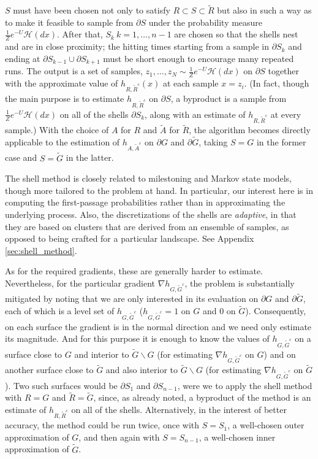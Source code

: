 \documentclass[12pt, nofootinbib,english, amsmath, amssymb, aps, priprint, graphicx,floatfix]{revtex4-1}
\theoremstyle{plain}
\theoremstyle{definition}
\theoremstyle{plain}
\newcommand{\hausdorffmeasure}{\mathscr{H}(dx)}
\begin{document}
$S$ must have been chosen not only to satisfy $R\subset S  \subset\tilde{R}$ but also in such a way as to make it feasible to sample from $\partial S$ under the probability measure
$\frac{1}{Z}e^{-U}\hausdorffmeasure$. After that, $S_k\ k=1,\ldots,n-1$ are chosen so that the shells nest and are in close proximity; the hitting times starting from a sample in $\partial
 S_k$ and ending at $\partial S_{k-1} \cup \partial S_{k+1}$ must be short enough to encourage many repeated runs. The output is a set of samples,
 $z_1,\ldots,z_N \sim \frac{1}{Z}e^{-U}\hausdorffmeasure$ on $\partial S$ together with the approximate value of $h_{R,\tilde{R}^c}(x)$ at each sample $x=z_i$. (In fact, though the main purpose is to estimate $h_{R,\tilde{R}^c}$ on
 $\partial S$, a byproduct is a sample from $\frac{1}{Z}e^{-U}\hausdorffmeasure$ on all of the shells $\partial S_k$, along with an estimate of $h_{R,\tilde{R}^c}$ at every sample.)
With the choice of $A$ for $R$ and $\tilde A$ for $\tilde R$, the algorithm becomes directly applicable to the estimation of $h_{A, \tilde{A}^c}$ on $\partial G$ and $\partial\tilde{G}$, taking $S=G$ in the former case and $S=\tilde{G}$ in the latter.

The shell method is closely related to milestoning\cite{West2007-cn, Bello-Rivas2015-ld, Aristoff2016-gc} and Markov state models\cite{Pande2010-yi, Chodera2014-bh, Husic2018-xp}, though more tailored to the problem at hand. In particular, our interest here is in computing the first-passage probabilities rather than in approximating the underlying process. Also, the discretizations of the shells are {\em adaptive}, in that they are based on clusters that are derived from an ensemble of samples, as opposed to being crafted for a particular landscape.  See Appendix \ref{sec:shell_method}.

As for the required gradients, these are generally harder to estimate. Nevertheless, for the particular gradient $\nabla h_{G, \tilde{G}^c}$, the problem is substantially mitigated by noting that we are only interested in its evaluation on $\partial G$ and $\partial\tilde G$, each of which is a level set of
$h_{G, \tilde{G}^c}$ ($h_{G, \tilde{G}^c}=1$ on $G$ and 0 on $\tilde G$). Consequently, on each surface the gradient is in the normal direction and we need only estimate its magnitude. And for this purpose it is enough to know the values of $h_{G, \tilde{G}^c}$ on a surface close to $G$ and interior to $\tilde{G}\backslash G$ (for estimating $\nabla h_{G, \tilde{G}^c}$ on $G$) and on another surface
close to $\tilde{G}$ and also interior to $\tilde{G}\backslash G$ (for estimating $\nabla h_{G, \tilde{G}^c}$ on $\tilde G$). Two such surfaces would be $\partial S_1$ and $\partial S_{n-1}$, were we to apply the shell method with $R=G$ and $\tilde{R}=\tilde{G}$,
since, as already noted, a byproduct of the method is an estimate of
$h_{R,\tilde{R}^c}$ on all of the shells. Alternatively, in the interest of better accuracy, the method could be run twice, once with $S=S_1$, a well-chosen outer approximation of $G$, and then again with
$S=S_{n-1}$, a well-chosen inner approximation of $\tilde G$.
\end{document}
